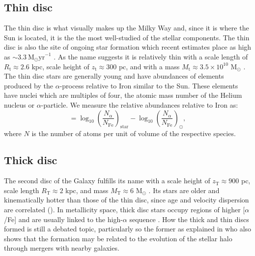 \subsection{Thin disc}\label{subsec:components-thindisc}
The thin disc is what visually makes up the Milky Way and, since it is where the Sun is located, it is the the most well-studied of the stellar components. The thin disc is also the site of ongoing star formation which recent estimates place as high as ${\sim}3.3\ \mathrm{M_\odot yr}^{-1}$ \citep{zari:22}. As the name suggests it is relatively thin with a scale length of $R_\mathrm{t} \approx 2.6$ kpc, scale height of $z_\mathrm{t} \approx 300$ pc, and with a mass $M_\mathrm{t} \approx 3.5\times 10^{10}$ M$_\odot$ \citep{bland-hawthorn:16}. The thin disc stars are generally young and have abundances of elements produced by the $\alpha$-process \citep{burbidge:57} relative to Iron similar to the Sun. These elements have nuclei which are multiples of four, the atomic mass number of the Helium nucleus or $\alpha$-particle. We measure the relative abundances relative to Iron as:
\begin{equation}
    [\alpha/\mathrm{Fe}] = \log_{10}\left(\frac{N_\alpha}{N_\mathrm{Fe}}\right)_\mathrm{star} - \log_{10}\left(\frac{N_\alpha}{N_\mathrm{Fe}}\right)_\odot,
\end{equation}
where $N$ is the number of atoms per unit of volume of the respective species.

\subsection{Thick disc}\label{subsec:components-thickdisc}
The second disc of the Galaxy fulfills its name with a scale height of $z_\mathrm{T}\approx 900$ pc, scale length $R_\mathrm{T} \approx 2$ kpc, and mass $M_\mathrm{T} \approx 6$ M$_\odot$ \citep{bland-hawthorn:16}. Its stars are older \citep{martig:16} and kinematically hotter than those of the thin disc, since age and velocity dispersion are correlated (\citealt{martig:14,aumer:16}). In metallicity space, thick disc stars occupy regions of higher [$\alpha$/Fe] and are usually linked to the high-$\alpha$ sequence \citep{katz:21}. How the thick and thin discs formed is still a debated topic, particularly so the former as explained in \cite{helmi:20} who also shows that the formation may be related to the evolution of the stellar halo through mergers with nearby galaxies. 

